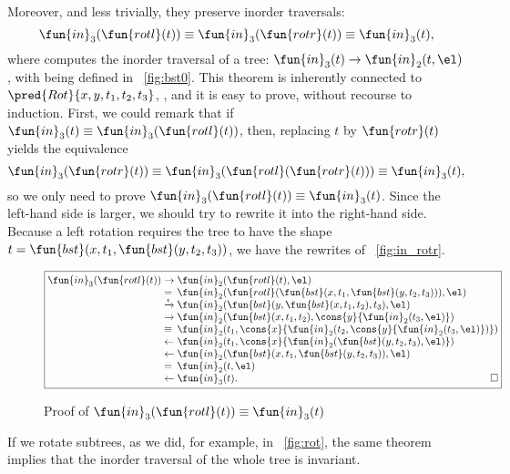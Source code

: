 Moreover, and less trivially, they preserve inorder traversals:
\begin{equation*}
  \abovedisplayskip=5pt
  \belowdisplayskip=5pt
  \fun{in}_3(\fun{rotl}(t)) \equiv \fun{in}_3(\fun{rotr}(t)) \equiv
  \fun{in}_3(t),
\end{equation*}
where  computes the
inorder traversal of a tree: \(\fun{in}_3(t) \rightarrow
\fun{in}_2(t,\el)\), with 
being defined in \fig~\vref{fig:bst0}. This theorem is inherently
connected to
\(\pred{Rot}{x,y,t_1,t_2,t_3}\),
, and it is easy to prove, without recourse to
induction. First, we could remark that if \(\fun{in}_3(t) \equiv
\fun{in}_3(\fun{rotl}(t))\), then, replacing \(t\) by
\(\fun{rotr}(t)\) yields the equivalence
\begin{equation*}
  \fun{in}_3(\fun{rotr}(t))
  \equiv \fun{in}_3(\fun{rotl}(\fun{rotr}(t))) \equiv \fun{in}_3(t),
\end{equation*}
so we only need to prove \(\fun{in}_3(\fun{rotl}(t)) \equiv
\fun{in}_3(t)\).  Since the left\hyp{}hand side is larger, we should
try to rewrite it into the right\hyp{}hand side. Because a left
rotation requires the tree to have the shape
\(t=\fun{bst}(x,t_1,\fun{bst}(y,t_2,t_3))\), we have the rewrites of
\fig~\vref{fig:in_rotr}.
\begin{figure}
  \begin{equation*}
    \boxed{
      \begin{array}{@{}r@{\;}l@{\;}l@{}}
  \fun{in}_3(\fun{rotl}(t))
  & \rightarrow & \fun{in}_2(\fun{rotl}(t),\el)\\
  & = & \fun{in}_2(\fun{rotl}(\fun{bst}(x,t_1,\fun{bst}(y,t_2,t_3))),\el)\\
  & \xrightarrow{\smash{\epsilon}} &
  \fun{in}_2(\fun{bst}(y,\fun{bst}(x,t_1,t_2),t_3),\el)\\
  & \rightarrow &
  \fun{in}_2(\fun{bst}(x,t_1,t_2),\cons{y}{\fun{in}_2(t_3,\el)})\\
  & \equiv &
 \fun{in}_2(t_1,\cons{x}{\fun{in}_2(t_2,\cons{y}{\fun{in}_2(t_3,\el)})})\\
  & \leftarrow &
  \fun{in}_2(t_1,\cons{x}{\fun{in}_2(\fun{bst}(y,t_2,t_3),\el)})\\
  & \leftarrow &
  \fun{in}_2(\fun{bst}(x,t_1,\fun{bst}(y,t_2,t_3)),\el)\\
  & = &
  \fun{in}_2(t,\el)\\
  & \leftarrow &
  \fun{in}_3(t).\hfill\Box
\end{array}
}
\end{equation*}
\caption{Proof of \(\fun{in}_3(\fun{rotl}(t)) \equiv \fun{in}_3(t)\)}
\label{fig:in_rotr}
\end{figure}
If we rotate subtrees, as we did, for example, in \fig~\vref{fig:rot},
the same theorem implies that the inorder traversal of the whole tree
is invariant.

